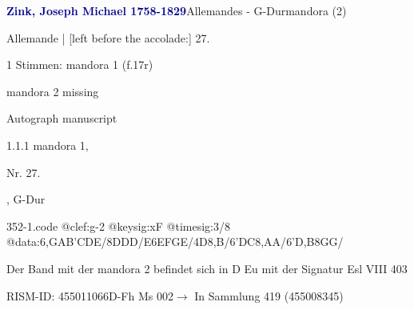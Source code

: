 \documentclass[twocolumn]{book}
\begin{document}
\par \vspace{7pt} \textcolor{darkblue}{\textbf{Zink, Joseph Michael  1758-1829}}\hfillplus{\textbf{[352]}}\newline Allemandes - G-Dur\newline mandora (2)
\par \begin{itshape}[f.17r, at left:] Allemande | [left before the accolade:] 27.\end{itshape} 
\par \textcolor{darkblue}{}  1 Stimmen: mandora 1  (f.17r)\newline \begin{small} mandora 2 missing\end{small} \newline Autograph manuscript
\par 1.1.1  mandora 1, \begin{itshape}Nr. 27.\end{itshape}, G-Dur  
\begin{filecontents*}{352-1.code}
@clef:g-2
@keysig:xF
@timesig:3/8
@data:{6,GA}{B'C}DE/8DDD/E{6EF}{GE}/4D8,B/{6'DC}8,AA/{6'D,B}8GG/
\end{filecontents*}
\newline
%
\par Der Band mit der mandora 2 befindet sich in D Eu mit der Signatur Esl VIII 403
\par RISM-ID: 455011066\newline D-Fh  Ms 002\newline $\rightarrow$ In Sammlung 419 (455008345)
      
\end{document}
